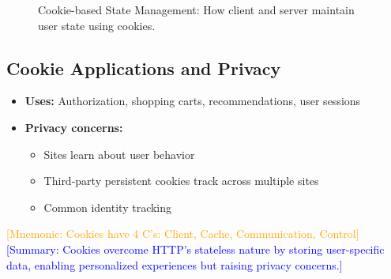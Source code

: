 \documentclass[12pt]{article}
\begin{document}
\begin{figure}[h]
    \centering
    \caption{Cookie-based State Management: How client and server maintain user state using cookies.}
    \label{fig:cookie_state}
\end{figure}


\subsection{Cookie Applications and Privacy}
\begin{itemize}
    \item \textbf{Uses:} Authorization, shopping carts, recommendations, user sessions
    \item \textbf{Privacy concerns:}
          \begin{itemize}
              \item Sites learn about user behavior
              \item Third-party persistent cookies track across multiple sites
              \item Common identity tracking
          \end{itemize}
\end{itemize}

\textcolor{orange}{[Mnemonic: Cookies have 4 C's: Client, Cache, Communication, Control]}
\textcolor{blue}{[Summary: Cookies overcome HTTP's stateless nature by storing user-specific data, enabling personalized experiences but raising privacy concerns.]}
\end{document}
